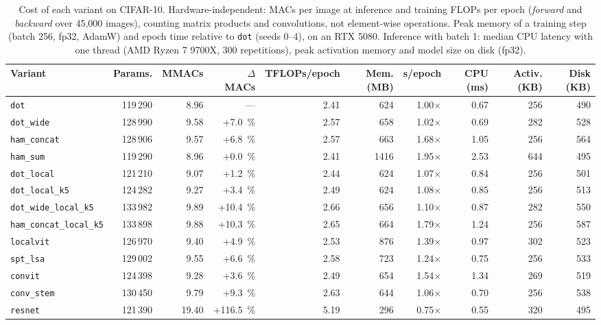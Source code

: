
\begin{table}[!t]
\centering
\small
\caption{Cost of each variant on CIFAR-10. Hardware-independent: MACs per image at inference and training FLOPs per epoch (\emph{forward} and \emph{backward} over 45{,}000 images), counting matrix products and convolutions, not element-wise operations. Peak memory of a training step (batch 256, fp32, AdamW) and epoch time relative to \texttt{dot} (seeds 0--4), on an RTX 5080. Inference with batch 1: median CPU latency with one thread (AMD Ryzen 7 9700X, 300 repetitions), peak activation memory and model size on disk (fp32).}
\label{tab:costos}
\begin{adjustbox}{max width=\linewidth}
\begin{tabular}{lrrrrrrrrr}
\toprule
Variant & Params. & MMACs & $\Delta$ MACs & TFLOPs/epoch & Mem. (MB) & s/epoch & CPU (ms) & Activ. (KB) & Disk (KB) \\
\midrule
\texttt{dot} & 119\,290 & 8.96 & --- & 2.41 & 624 & 1.00$\times$ & 0.67 & 256 & 490 \\
\texttt{dot\_wide} & 128\,990 & 9.58 & +7.0~\% & 2.57 & 658 & 1.02$\times$ & 0.69 & 282 & 528 \\
\texttt{ham\_concat} & 128\,906 & 9.57 & +6.8~\% & 2.57 & 663 & 1.68$\times$ & 1.05 & 256 & 564 \\
\texttt{ham\_sum} & 119\,290 & 8.96 & +0.0~\% & 2.41 & 1416 & 1.95$\times$ & 2.53 & 644 & 495 \\
\texttt{dot\_local} & 121\,210 & 9.07 & +1.2~\% & 2.44 & 624 & 1.07$\times$ & 0.84 & 256 & 501 \\
\texttt{dot\_local\_k5} & 124\,282 & 9.27 & +3.4~\% & 2.49 & 624 & 1.08$\times$ & 0.85 & 256 & 513 \\
\texttt{dot\_wide\_local\_k5} & 133\,982 & 9.89 & +10.4~\% & 2.66 & 656 & 1.10$\times$ & 0.87 & 282 & 550 \\
\texttt{ham\_concat\_local\_k5} & 133\,898 & 9.88 & +10.3~\% & 2.65 & 664 & 1.79$\times$ & 1.24 & 256 & 587 \\
\midrule
\texttt{localvit} & 126\,970 & 9.40 & +4.9~\% & 2.53 & 876 & 1.39$\times$ & 0.97 & 302 & 523 \\
\texttt{spt\_lsa} & 129\,002 & 9.55 & +6.6~\% & 2.58 & 723 & 1.24$\times$ & 0.75 & 256 & 533 \\
\texttt{convit} & 124\,398 & 9.28 & +3.6~\% & 2.49 & 654 & 1.54$\times$ & 1.34 & 269 & 519 \\
\texttt{conv\_stem} & 130\,450 & 9.79 & +9.3~\% & 2.63 & 644 & 1.06$\times$ & 0.70 & 256 & 538 \\
\texttt{resnet} & 121\,390 & 19.40 & +116.5~\% & 5.19 & 296 & 0.75$\times$ & 0.55 & 320 & 495 \\
\bottomrule
\end{tabular}
\end{adjustbox}
\end{table}
